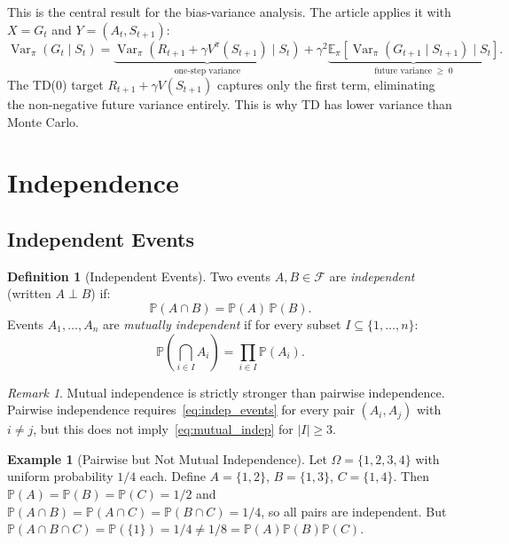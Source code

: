 \documentclass[11pt,a4paper]{article}
\theoremstyle{definition}
\newtheorem{definition}{Definition}[section]
\newtheorem{example}{Example}[section]
\theoremstyle{plain}
\theoremstyle{remark}
\newtheorem{remark}{Remark}[section]
\DeclareMathOperator{\Var}{Var}
\newcommand{\E}{\mathbb{E}}
\newcommand{\Prob}{\mathbb{P}}
\begin{document}
\begin{tdconnection}
This is the central result for the bias-variance analysis. The article applies it with $X = G_t$ and $Y = (A_t, S_{t+1})$:
\[
    \Var_\pi(G_t \mid S_t) = \underbrace{\Var_\pi(R_{t+1} + \gamma V^\pi(S_{t+1}) \mid S_t)}_{\text{one-step variance}} + \gamma^2 \underbrace{\E_\pi[\Var_\pi(G_{t+1} \mid S_{t+1}) \mid S_t]}_{\text{future variance} \;\geq\; 0}.
\]
The TD(0) target $R_{t+1} + \gamma V(S_{t+1})$ captures only the first term, eliminating the non-negative future variance entirely. This is why TD has lower variance than Monte Carlo.
\end{tdconnection}

\section{Independence}
\label{sec:independence}

\subsection{Independent Events}
\label{subsec:indep_events}

\begin{definition}[Independent Events]
\label{def:indep_events}
Two events $A, B \in \mathcal{F}$ are \emph{independent} (written $A \perp B$) if:
\begin{equation}
    \Prob(A \cap B) = \Prob(A)\, \Prob(B).
    \label{eq:indep_events}
\end{equation}
Events $A_1, \ldots, A_n$ are \emph{mutually independent} if for every subset $I \subseteq \{1, \ldots, n\}$:
\begin{equation}
    \Prob\!\left(\bigcap_{i \in I} A_i\right) = \prod_{i \in I} \Prob(A_i).
    \label{eq:mutual_indep}
\end{equation}
\end{definition}

\begin{remark}
Mutual independence is strictly stronger than pairwise independence. Pairwise independence requires~\eqref{eq:indep_events} for every pair $(A_i, A_j)$ with $i \neq j$, but this does not imply~\eqref{eq:mutual_indep} for $|I| \geq 3$.
\end{remark}

\begin{example}[Pairwise but Not Mutual Independence]
\label{ex:pairwise_not_mutual}
Let $\Omega = \{1, 2, 3, 4\}$ with uniform probability $1/4$ each. Define $A = \{1,2\}$, $B = \{1,3\}$, $C = \{1,4\}$. Then $\Prob(A) = \Prob(B) = \Prob(C) = 1/2$ and $\Prob(A \cap B) = \Prob(A \cap C) = \Prob(B \cap C) = 1/4$, so all pairs are independent. But $\Prob(A \cap B \cap C) = \Prob(\{1\}) = 1/4 \neq 1/8 = \Prob(A)\Prob(B)\Prob(C)$.
\end{example}
\end{document}
